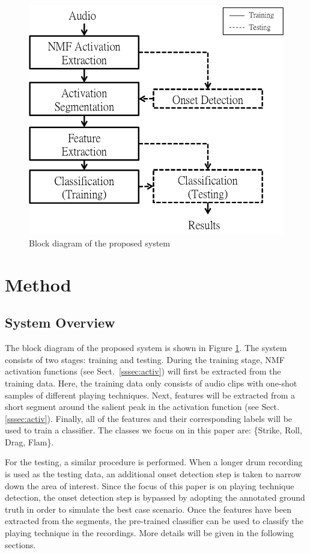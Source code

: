 \documentclass{article}
\begin{document}
\begin{figure}
\centering
\includegraphics[width = 7 cm]{./figures/block_diagram.png}
\caption{Block diagram of the proposed system}
\label{fig:block}
\end{figure}

\section{Method}\label{sec:method}
\subsection{System Overview}\label{ssec:overview}

The block diagram of the proposed system is shown in Figure \ref{fig:block}. The system consists of two stages: training and testing. During the training stage, NMF activation functions (see Sect.~\ref{sssec:activ}) will first be extracted from the training data. Here, the training data only consists of audio clips with one-shot samples of different playing techniques. Next, features will be extracted from a short segment around the salient peak in the activation function (see Sect. \ref{sssec:activ}). Finally, all of the features and their corresponding labels will be used to train a classifier. The classes we focus on in this paper are: \{Strike, Roll, Drag, Flam\}. 

For the testing, a similar procedure is performed. When a longer drum recording is used as the testing data, an additional onset detection step is taken to narrow down the area of interest. %
Since the focus of this paper is on playing technique detection, the onset detection step is bypassed by adopting the annotated ground truth in order to simulate the best case scenario. Once the features have been extracted from the segments, the pre-trained classifier can be used to classify the playing technique in the recordings. More details will be given in the following sections. 
 
\end{document}
